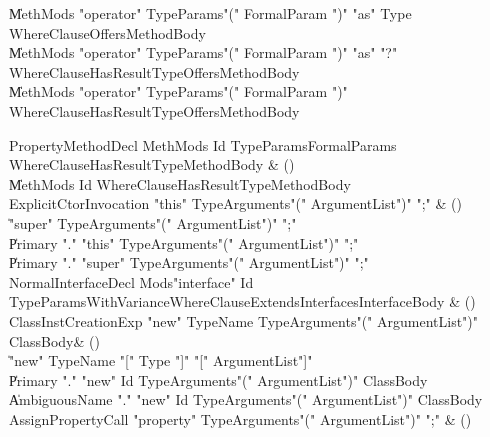 \begin{bbgrammar}
    \| MethMods \xcd"operator" TypeParams\opt \xcd"(" FormalParam  \xcd")" \xcd"as" Type WhereClause\opt Offers\opt MethodBody\\
    \| MethMods \xcd"operator" TypeParams\opt \xcd"(" FormalParam  \xcd")" \xcd"as" \xcd"?" WhereClause\opt HasResultType\opt Offers\opt MethodBody\\
    \| MethMods \xcd"operator" TypeParams\opt \xcd"(" FormalParam  \xcd")" WhereClause\opt HasResultType\opt Offers\opt MethodBody\\
\end{bbgrammar}

\begin{bbgrammar}

 PropertyMethodDecl  \label{prod:PropertyMethodDecl}  \: MethMods Id TypeParams\opt FormalParams WhereClause\opt HasResultType\opt MethodBody & ()\\
    \| MethMods Id WhereClause\opt HasResultType\opt MethodBody\\
 ExplicitCtorInvocation  \label{prod:ExplicitCtorInvocation}  \: \xcd"this" TypeArguments\opt \xcd"(" ArgumentList\opt \xcd")" \xcd";" & ()\\
    \| \xcd"super" TypeArguments\opt \xcd"(" ArgumentList\opt \xcd")" \xcd";"\\
    \| Primary \xcd"." \xcd"this" TypeArguments\opt \xcd"(" ArgumentList\opt \xcd")" \xcd";"\\
    \| Primary \xcd"." \xcd"super" TypeArguments\opt \xcd"(" ArgumentList\opt \xcd")" \xcd";"\\
 NormalInterfaceDecl  \label{prod:NormalInterfaceDecl}  \: Mods\opt \xcd"interface" Id TypeParamsWithVariance\opt WhereClause\opt ExtendsInterfaces\opt InterfaceBody & ()\\
 ClassInstCreationExp  \label{prod:ClassInstCreationExp}  \: \xcd"new" TypeName TypeArguments\opt \xcd"(" ArgumentList\opt \xcd")" ClassBody\opt & ()\\
    \| \xcd"new" TypeName \xcd"[" Type \xcd"]" \xcd"[" ArgumentList\opt \xcd"]"\\
    \| Primary \xcd"." \xcd"new" Id TypeArguments\opt \xcd"(" ArgumentList\opt \xcd")" ClassBody\opt\\
    \| AmbiguousName \xcd"." \xcd"new" Id TypeArguments\opt \xcd"(" ArgumentList\opt \xcd")" ClassBody\opt\\
 AssignPropertyCall  \label{prod:AssignPropertyCall}  \: \xcd"property" TypeArguments\opt \xcd"(" ArgumentList\opt \xcd")" \xcd";" & ()\\

\end{bbgrammar}
